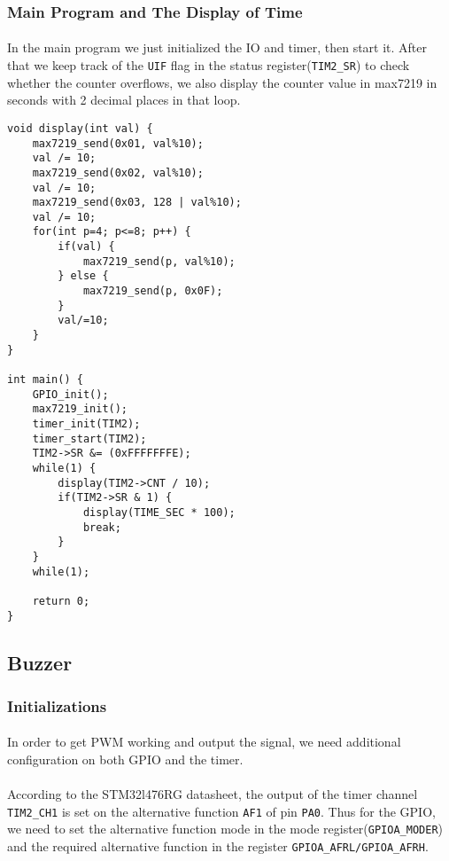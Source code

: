 \subsubsection{Main Program and The Display of Time}
\paragraph{}
In the main program we just initialized the IO and timer, then start it.
After that we keep track of the \texttt{UIF} flag in the status register(\texttt{TIM2\_SR}) to check whether the counter overflows,
 we also display the counter value in max7219 in seconds with 2 decimal places in that loop.
\begin{lstlisting}
void display(int val) {
	max7219_send(0x01, val%10);
	val /= 10;
	max7219_send(0x02, val%10);
	val /= 10;
	max7219_send(0x03, 128 | val%10);
	val /= 10;
	for(int p=4; p<=8; p++) {
		if(val) {
			max7219_send(p, val%10);
		} else {
			max7219_send(p, 0x0F);
		}
		val/=10;
	}
}

int main() {
	GPIO_init();
	max7219_init();
	timer_init(TIM2);
	timer_start(TIM2);
	TIM2->SR &= (0xFFFFFFFE);
	while(1) {
		display(TIM2->CNT / 10);
		if(TIM2->SR & 1) {
			display(TIME_SEC * 100);
			break;
		}
	}
    while(1);

	return 0;
}
\end{lstlisting}

\subsection{Buzzer}
\subsubsection{Initializations}
\paragraph{}
In order to get PWM working and output the signal, we need additional configuration on both GPIO and the timer.
\paragraph{}
According to the STM32l476RG datasheet,
the output of the timer channel \texttt{TIM2\_CH1} is set on the alternative function \texttt{AF1} of pin \texttt{PA0}.
Thus for the GPIO, we need to set the alternative function mode in the mode register(\texttt{GPIOA\_MODER}) and the required alternative function in the register \texttt{GPIOA\_AFRL/GPIOA\_AFRH}.
